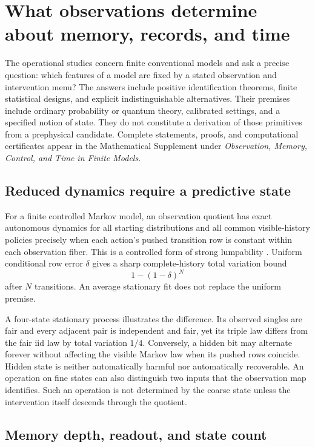 \section{What observations determine about memory, records, and time}
\label{op:collections}

The operational studies concern finite conventional models and ask a precise
question: which features of a model are fixed by a stated observation and
intervention menu?  The answers include positive identification theorems,
finite statistical designs, and explicit indistinguishable alternatives.
Their premises include ordinary probability or quantum theory, calibrated
settings, and a specified notion of state.  They do not constitute a
derivation of those primitives from a prephysical candidate.
Complete statements, proofs, and computational certificates appear in the
Mathematical Supplement under \emph{Observation, Memory, Control, and Time
in Finite Models}.

\subsection{Reduced dynamics require a predictive state}

For a finite controlled Markov model, an observation quotient has exact
autonomous dynamics for all starting distributions and all common
visible-history policies precisely when each action's pushed transition
row is constant within each observation fiber.  This is a controlled form
of strong lumpability \cite{op:wolfer}.  Uniform conditional row error
\(\delta\) gives a sharp complete-history total variation bound
\[
 1-(1-\delta)^N
\]
after \(N\) transitions.  An average stationary fit does not replace the
uniform premise.

A four-state stationary process illustrates the difference.  Its observed
singles are fair and every adjacent pair is independent and fair, yet its
triple law differs from the fair iid law by total variation \(1/4\).
Conversely, a hidden bit may alternate forever without affecting the
visible Markov law when its pushed rows coincide.  Hidden state is neither
automatically harmful nor automatically recoverable.
An operation on fine states can also distinguish two inputs that the
observation map identifies.  Such an operation is not determined by the
coarse state unless the intervention itself descends through the quotient.

\subsection{Memory depth, readout, and state count}

